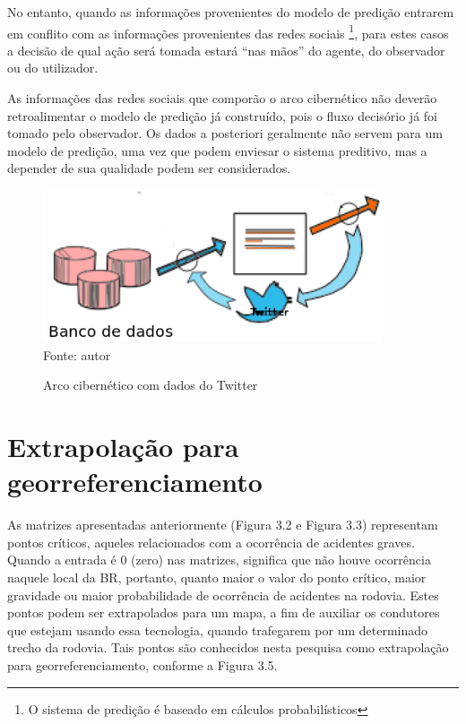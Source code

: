 No entanto, quando as informações provenientes do modelo de predição entrarem em conflito com as informações 
provenientes das redes sociais \footnote{O sistema de predição é baseado em cálculos probabilísticos}, para estes casos a decisão de qual ação será tomada estará ``nas mãos'' do agente, do observador ou do utilizador.

As informações das redes sociais que comporão o arco cibernético não deverão retroalimentar o modelo de predição já construído, pois o fluxo decisório já foi tomado pelo observador. Os dados a posteriori geralmente não servem para um modelo de predição, uma vez que podem enviesar o sistema preditivo, mas a depender de sua qualidade podem ser considerados.

\begin{figure}[ht]
	\centering
	\caption{Arco cibernético com dados do Twitter}
	\includegraphics[width=100mm, height=45mm]{Figuras/Metodologia/ArcoCibernetico.png}\\
	\tiny Fonte: autor
\end{figure}

\vspace{10mm}

\section{Extrapolação para georreferenciamento}

As matrizes apresentadas anteriormente (Figura 3.2 e Figura 3.3) representam pontos críticos, aqueles relacionados com a ocorrência de acidentes graves. Quando a entrada é 0 (zero) nas matrizes, significa que não houve ocorrência naquele local da BR, portanto, quanto maior o valor do ponto crítico, maior gravidade ou maior probabilidade de ocorrência de acidentes na rodovia. 
Estes pontos podem ser extrapolados para um mapa, a fim de auxiliar os condutores que estejam usando essa tecnologia, quando trafegarem por um determinado trecho da rodovia. Tais pontos são conhecidos nesta pesquisa como extrapolação para georreferenciamento, conforme a Figura 3.5.

